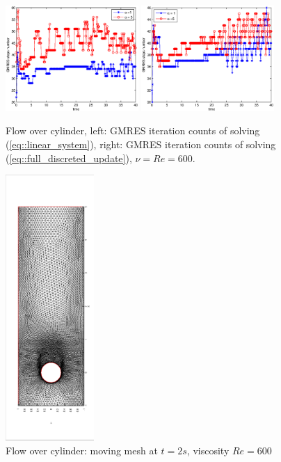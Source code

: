 \documentclass{eajam}
\begin{document}
      \begin{figure}[!htbp]
        \begin{center}
          \includegraphics[width = 0.45\textwidth]{picture/obstacle_flow_data/NS_iterate_steps.eps}
          \includegraphics[width = 0.45\textwidth]{picture/obstacle_flow_data/moving_iterate_steps.eps}
        \end{center}
        \caption{\small Flow over cylinder, left: GMRES iteration counts of
          solving (\ref{eq::linear_system}), right: GMRES iteration
          counts of solving (\ref{eq::full_discreted_update}), $\nu =
          Re = 600$.}
        \label{fig::cylinder_GMRES_steps}
      \end{figure}
      
      
      \begin{figure}[!htbp]
        \centering
        \includegraphics[width = 0.3\textwidth, angle = -90]{picture/obstacle_flow_data/mesh_t_2s.eps}
        \caption{\small Flow over cylinder: moving mesh at $t = 2s$,
          viscosity $Re = 600$}
        \label{fig::cylinder_mesh_2s}
      \end{figure}
\end{document}
